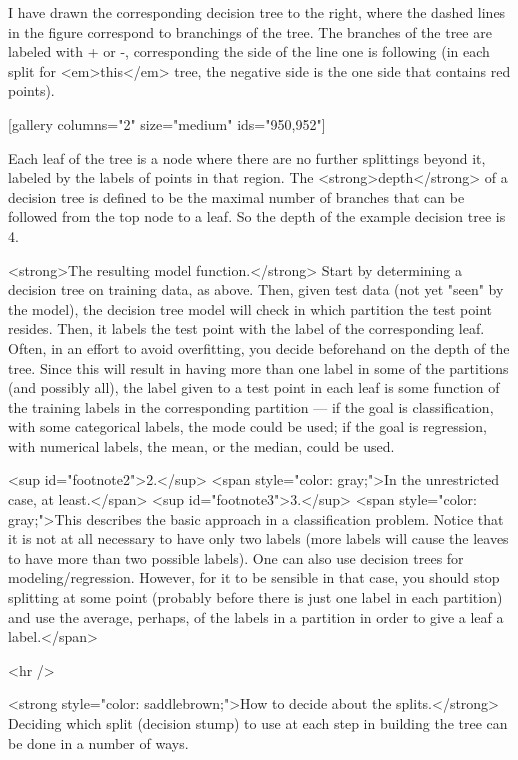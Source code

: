 \documentclass[smaller]{beamer}
\theoremstyle{example}
\begin{document}
\begin{frame}
I have drawn the corresponding decision tree to the right, where the dashed lines in the figure correspond to branchings of the tree. The branches of the tree are labeled with + or -, corresponding the side of the line one is following (in each split for <em>this</em> tree, the negative side is the one side that contains red points).

[gallery columns="2" size="medium" ids="950,952"]

Each leaf of the tree is a node where there are no further splittings beyond it, labeled by the labels of points in that region. The <strong>depth</strong> of a decision tree is defined to be the maximal number of branches that can be followed from the top node to a leaf. So the depth of the example decision tree is 4.

<strong>The resulting model function.</strong> Start by determining a decision tree on training data, as above. Then, given test data (not yet "seen" by the model), the decision tree model will check in which partition the test point resides. Then, it labels the test point with the label of the corresponding leaf. Often, in an effort to avoid overfitting, you decide beforehand on the depth of the tree. Since this will result in having more than one label in some of the partitions (and possibly all), the label given to a test point in each leaf is some function of the training labels in the corresponding partition — if the goal is classification, with some categorical labels, the mode could be used; if the goal is regression, with numerical labels, the mean, or the median, could be used.

<sup id="footnote2">2.</sup> <span style="color: gray;">In the unrestricted case, at least.</span>
<sup id="footnote3">3.</sup> <span style="color: gray;">This describes the basic approach in a classification problem. Notice that it is not at all necessary to have only two labels (more labels will cause the leaves to have more than two possible labels). One can also use decision trees for modeling/regression. However, for it to be sensible in that case, you should stop splitting at some point (probably before there is just one label in each partition) and use the average, perhaps, of the labels in a partition in order to give a leaf a label.</span>

<hr />

<strong style="color: saddlebrown;">How to decide about the splits.</strong> Deciding which split (decision stump) to use at each step in building the tree can be done in a number of ways.


\end{frame}
\end{document}
